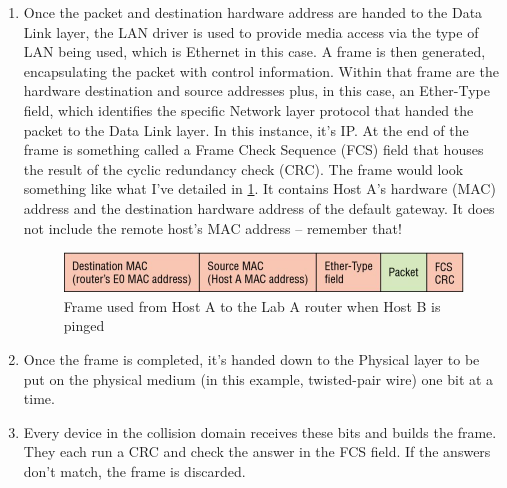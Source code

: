 \begin{enumerate}
  If the hardware address isn't already in the ARP cache of the host, an ARP broadcast will be sent out onto the local network to search for the 172.16.10.1 hardware address.
  The router then responds to the request and provides the hardware address of Ethernet0, and the host caches this address.
\item
   Once the packet and destination hardware address are handed to the
   Data Link layer, the LAN driver is used to provide media access via
   the type of LAN being used, which is Ethernet in this
   case. A frame is then generated, encapsulating the packet with control
   information. Within that frame are the hardware destination and source
   addresses plus, in this case, an Ether-Type field, which identifies
   the specific Network layer protocol that handed the packet to the Data
   Link layer. In this instance, it's IP. At the end of the frame is
   something called a Frame Check Sequence (FCS) field that houses the
   result of the cyclic redundancy check (CRC). The frame would look
   something like what I've detailed in \cref{fig:host-a-frame}.
   It contains Host A's hardware (MAC) address and the destination hardware address of the default gateway.
   It does not include the remote host's MAC address -- remember that!

   \begin{figure}
      \centering
      \includegraphics{images/c09f003.jpg}
      \caption{Frame used from Host A to the Lab A router when Host B is pinged}
      \label{fig:host-a-frame}
   \end{figure}
\item
  Once the frame is completed, it's handed down to the Physical layer to
  be put on the physical medium (in this example, twisted-pair wire) one
  bit at a time.
\item
  Every device in the collision domain receives these bits and builds
  the frame. They each run a CRC and check the answer in the FCS field.
  If the answers don't match, the frame is discarded.


\end{enumerate}
